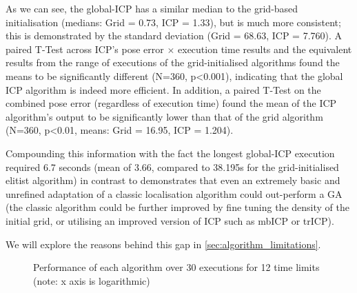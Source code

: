\documentclass[authoryearcitations]{UoYCSproject}
\begin{document}
As we can see, the global-ICP has a similar median to the grid-based initialisation (medians: Grid = 0.73, ICP = 1.33), but is much more consistent; this is demonstrated by the standard deviation (Grid = 68.63, ICP = 7.760). A paired T-Test across ICP's pose error $\times$ execution time results and the equivalent results from the range of executions of the grid-initialised algorithms found the means to be significantly different (N=360, p<0.001), indicating that the global ICP algorithm is indeed more efficient. In addition, a paired T-Test on the combined pose error (regardless of execution time) found the mean of the ICP algorithm's output to be significantly lower than that of the grid algorithm (N=360, p<0.01, means: Grid = 16.95, ICP = 1.204). 

Compounding this information with the fact the longest global-ICP execution required 6.7 seconds (mean of 3.66, compared to 38.195s for the grid-initialised elitist algorithm) in contrast to  demonstrates that even an extremely basic and unrefined adaptation of a classic localisation algorithm could out-perform a GA (the classic algorithm could be further improved by fine tuning the density of the initial grid, or utilising an improved version of ICP such as mbICP or trICP).

We will explore the reasons behind this gap in \autoref{sec:algorithm_limitations}.


\begin{figure}
	\caption[Global-ICP performance against Grid Initialisation] {Performance of each algorithm over 30 executions for 12 time limits (note: x axis is logarithmic)}
	\label{fig:icp_vs_grid_box_whiskers}
\end{figure}
\end{document}
